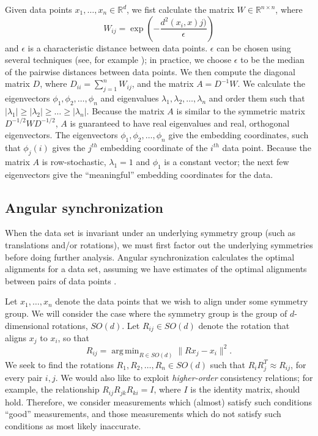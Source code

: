 \documentclass[10pt]{article}
\DeclareMathOperator*{\argmin}{arg\,min}
\begin{document}
Given data points $x_1, \dots, x_n \in \mathbb{R}^d$, we fist calculate the matrix $W \in \mathbb{R}^{n \times n}$, where 
\begin{equation}
W_{ij} = \exp \left( -\frac{d^2(x_i, x)j)}{\epsilon} \right)
\end{equation}
and $\epsilon$ is a characteristic distance between data points.
%
$\epsilon$ can be chosen using several techniques (see, for example \cite{coifman2008graph}); in practice, we choose $\epsilon$ to be the median of the pairwise distances between data points.
%
We then compute the diagonal matrix $D$, where $D_{ii} = \sum_{j=1}^{n} W_{ij}$, and the matrix $A = D^{-1} W$. 
%
We calculate the eigenvectors $\phi_1, \phi_2, \dots, \phi_n$ and eigenvalues $\lambda_1, \lambda_2, \dots, \lambda_n$ and order them such that $|\lambda_1| \ge |\lambda_2| \ge \dots \ge |\lambda_n|$. 
%
Because the matrix $A$ is similar to the symmetric matrix $D^{-1/2} W D^{-1/2}$, $A$ is guaranteed to have real eigenvalues and real, orthogonal eigenvectors. 
%
The eigenvectors $\phi_1, \phi_2, \dots, \phi_n$ give the embedding coordinates, such that $\phi_j(i)$ gives the $j^{th}$ embedding coordinate of the $i^{th}$ data point. 
%
Because the matrix $A$ is row-stochastic, $\lambda_1=1$ and $\phi_1$ is a constant vector; the next few eigenvectors give the ``meaningful'' embedding coordinates for the data. 

\subsection*{Angular synchronization}

When the data set is invariant under an underlying symmetry group (such as translations and/or rotations), we must first factor out the underlying symmetries before doing further analysis.
%
Angular synchronization calculates the optimal alignments for a data set, assuming we have estimates of the optimal alignments between pairs of data points \cite{singer2011angular}. 

Let $x_1, \dots, x_n$ denote the data points that we wish to align under some symmetry group.
%
We will consider the case where the symmetry group is the group of $d$-dimensional rotations, $SO(d)$. 
%
Let $R_{ij} \in SO(d)$ denote the rotation that aligns $x_j$ to $x_i$, so that
\begin{equation}
R_{ij} = \argmin_{R \in SO(d)} \|Rx_j - x_i \|^2.
\end{equation}
%
We seek to find the rotations $R_1, R_2, \dots, R_n \in SO(d)$ such that $R_i R_j^T \approx R_{ij}$, for every pair $i, j$. 
%
We would also like to exploit {\em higher-order} consistency relations;
for example, the relationship $R_{ij} R_{jk} R_{ki} = I$, where $I$ is the identity matrix, should hold.
%
Therefore, we consider measurements which (almost) satisfy such conditions ``good'' measurements, and those measurements which do not satisfy such conditions as most likely inaccurate.
\end{document}
